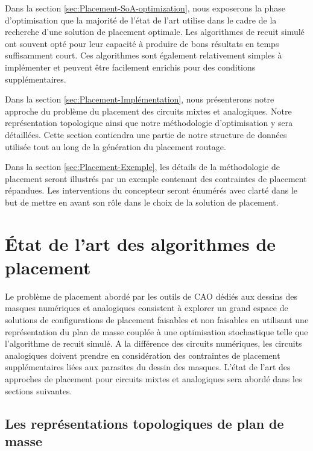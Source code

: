 \indent Dans la section \ref{sec:Placement-SoA-optimization}, nous exposerons la phase d'optimisation que la majorité de l'état de l'art utilise dans le cadre de la recherche d'une solution de placement optimale. Les algorithmes de recuit simulé ont souvent opté pour leur capacité à produire de bons résultats en temps suffisamment court. Ces algorithmes sont également relativement simples à implémenter et peuvent être facilement enrichis pour des conditions supplémentaires. \newline

\indent Dans la section \ref{sec:Placement-Implémentation}, nous présenterons notre approche du problème du placement des circuits mixtes et analogiques. Notre représentation topologique ainsi que notre méthodologie d'optimisation y sera détaillées. Cette section contiendra une partie de notre structure de données utilisée tout au long de la génération du placement routage. \newline

\indent Dans la section \ref{sec:Placement-Exemple}, les détails de la méthodologie de placement seront illustrés par un exemple contenant des contraintes de placement répandues. Les interventions du concepteur seront énumérés avec clarté dans le but de mettre en avant son rôle dans le choix de la solution de placement.

\section{\'Etat de l'art des algorithmes de placement}
\label{sec:Placement-SoA}

\indent Le problème de placement abordé par les outils de CAO dédiés aux dessins des masques numériques et analogiques consistent à explorer un grand espace de solutions de configurations de placement faisables et non faisables en utilisant une représentation du plan de masse couplée à une optimisation stochastique telle que l'algorithme de recuit simulé. A la différence des circuits numériques, les circuits analogiques doivent prendre en considération des contraintes de placement supplémentaires liées aux parasites du dessin des masques. L'état de l'art des approches de placement pour circuits mixtes et analogiques sera abordé dans les sections suivantes. 
\subsection{Les représentations topologiques de plan de masse}
\label{sec:Placement-SoA-topologie}

